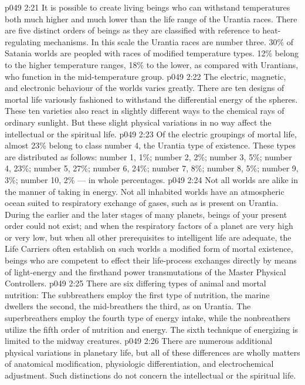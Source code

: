 \vs p049 2:21 \bibnobreakspace {} It is possible to create living beings who can withstand temperatures both much higher and much lower than the life range of the Urantia races. There are five distinct orders of beings as they are classified with reference to heat\hyp{}regulating mechanisms. In this scale the Urantia races are number three. 30\% of Satania worlds are peopled with races of modified temperature types. 12\% belong to the higher temperature ranges, 18\% to the lower, as compared with Urantians, who function in the mid\hyp{}temperature group.
\vs p049 2:22 \bibnobreakspace {} The electric, magnetic, and electronic behaviour of the worlds varies greatly. There are ten designs of mortal life variously fashioned to withstand the differential energy of the spheres. These ten varieties also react in slightly different ways to the chemical rays of ordinary sunlight. But these slight physical variations in no way affect the intellectual or the spiritual life.
\vs p049 2:23 Of the electric groupings of mortal life, almost 23\% belong to class number 4, the Urantia type of existence. These types are distributed as follows: number 1, 1\%; number 2, 2\%; number 3, 5\%; number 4, 23\%; number 5, 27\%; number 6, 24\%; number 7, 8\%; number 8, 5\%; number 9, 3\%; number 10, 2\% --- in whole percentages.
\vs p049 2:24 \bibnobreakspace {} Not all worlds are alike in the manner of taking in energy. Not all inhabited worlds have an atmospheric ocean suited to respiratory exchange of gases, such as is present on Urantia. During the earlier and the later stages of many planets, beings of your present order could not exist; and when the respiratory factors of a planet are very high or very low, but when all other prerequisites to intelligent life are adequate, the Life Carriers often establish on such worlds a modified form of mortal existence, beings who are competent to effect their life\hyp{}process exchanges directly by means of light\hyp{}energy and the firsthand power transmutations of the Master Physical Controllers.
\vs p049 2:25 There are six differing types of animal and mortal nutrition: The subbreathers employ the first type of nutrition, the marine dwellers the second, the mid\hyp{}breathers the third, as on Urantia. The superbreathers employ the fourth type of energy intake, while the nonbreathers utilize the fifth order of nutrition and energy. The sixth technique of energizing is limited to the midway creatures.
\vs p049 2:26 \bibnobreakspace {} There are numerous additional physical variations in planetary life, but all of these differences are wholly matters of anatomical modification, physiologic differentiation, and electrochemical adjustment. Such distinctions do not concern the intellectual or the spiritual life.
